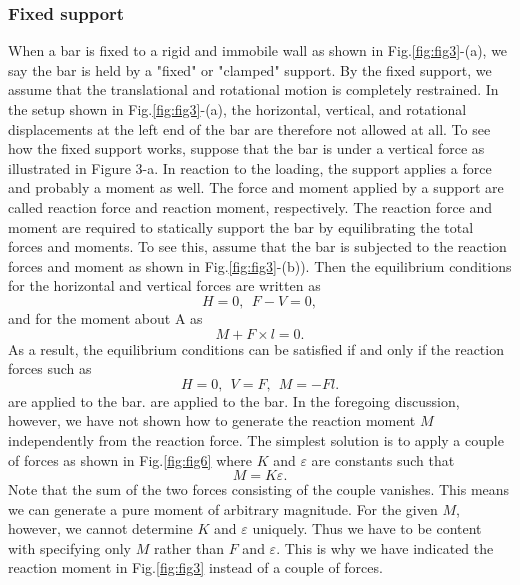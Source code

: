 ﻿\documentclass[10pt,a4j]{article}
\begin{document}
\subsubsection{Fixed support}
When a bar is fixed to a rigid and immobile wall as shown in Fig.\ref{fig:fig3}-(a),
we say the bar is held by a "fixed" or "clamped" support. By the fixed support, we assume that the translational and rotational motion is completely restrained. In the setup shown in Fig.\ref{fig:fig3}-(a), the horizontal, vertical, and rotational displacements at the left end of the bar are therefore not allowed at all. To see how the fixed support works, suppose that the bar is under a vertical force as illustrated in Figure 3-a. In reaction to the loading, the support applies a force and probably a moment as well. The force and moment applied by a support are called reaction force and reaction moment, respectively. The reaction force and moment are required to statically support the bar by equilibrating the total forces and moments. To see this, assume that the bar is subjected to the reaction forces and moment as shown in Fig.\ref{fig:fig3}-(b)). Then the equilibrium conditions for the horizontal and vertical forces are written as 
\begin{equation}
	H=0, \ \ F-V=0, 
	\label{eqn:}
\end{equation}
and for the moment about A as 
\begin{equation}
	M+F\times l =0.
	\label{eqn:}
\end{equation}
As a result, the equilibrium conditions can be satisfied if and only if the reaction forces such as   
\begin{equation}
	H=0, \ \ V=F, \ \ M=-Fl. 
	\label{eqn:}
\end{equation}
are applied to the bar. are applied to the bar. In the foregoing discussion, however, we have not shown how to generate the reaction moment $M$ independently from the reaction force. The simplest solution is to apply a couple of forces as shown in Fig.\ref{fig:fig6} where $K$ and $\varepsilon$ are constants such that 
\begin{equation}
	M=K\varepsilon.
	\label{eqn:}
\end{equation}
Note that the sum of the two forces consisting of the couple vanishes. 
This means we can generate a pure moment of arbitrary magnitude. 
For the given $M$, however, we cannot determine $K$ and $\varepsilon$ uniquely. 
Thus we have to be content with specifying only $M$ rather than $F$ and $\varepsilon$. 
This is why we have indicated the reaction moment in Fig.\ref{fig:fig3} instead of a couple of forces.
\end{document}
